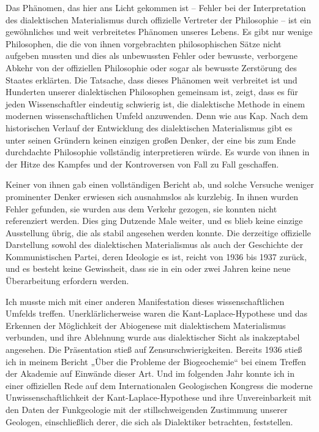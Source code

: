 \documentclass[11pt,a4paper]{book}
\begin{document}
Das Phänomen, das hier ans Licht gekommen ist -- Fehler bei der Interpretation des dialektischen Materialismus durch offizielle Vertreter der Philosophie -- ist ein gewöhnliches und weit verbreitetes Phänomen unseres Lebens. Es gibt nur wenige Philosophen, die die von ihnen vorgebrachten philosophischen Sätze nicht aufgeben mussten und dies als unbewussten Fehler oder bewusste, verborgene Abkehr von der offiziellen Philosophie oder sogar als bewusste Zerstörung des Staates erklärten. Die Tatsache, dass dieses Phänomen weit verbreitet ist und Hunderten unserer dialektischen Philosophen gemeinsam ist, zeigt, dass es für jeden Wissenschaftler eindeutig schwierig ist, die dialektische Methode in einem modernen wissenschaftlichen Umfeld anzuwenden. Denn wie aus Kap. Nach dem historischen Verlauf der Entwicklung des dialektischen Materialismus gibt es unter seinen Gründern keinen einzigen großen Denker, der eine bis zum Ende durchdachte Philosophie vollständig interpretieren würde. Es wurde von ihnen in der Hitze des Kampfes und der Kontroversen von Fall zu Fall geschaffen.



Keiner von ihnen gab einen vollständigen Bericht ab, und solche Versuche weniger prominenter Denker erwiesen sich ausnahmslos als kurzlebig. In ihnen wurden Fehler gefunden, sie wurden aus dem Verkehr gezogen, sie konnten nicht referenziert werden. Dies ging Dutzende Male weiter, und es blieb keine einzige Ausstellung übrig, die als stabil angesehen werden konnte. Die derzeitige offizielle Darstellung sowohl des dialektischen Materialismus als auch der Geschichte der Kommunistischen Partei, deren Ideologie es ist, reicht von 1936 bis 1937 zurück, und es besteht keine Gewissheit, dass sie in ein oder zwei Jahren keine neue Überarbeitung erfordern werden.



Ich musste mich mit einer anderen Manifestation dieses wissenschaftlichen Umfelds treffen. Unerklärlicherweise waren die Kant-Laplace-Hypothese und das Erkennen der Möglichkeit der Abiogenese mit dialektischem Materialismus verbunden, und ihre Ablehnung wurde aus dialektischer Sicht als inakzeptabel angesehen. Die Präsentation stieß auf Zensurschwierigkeiten. Bereits 1936 stieß ich in meinem Bericht „Über die Probleme der Biogeochemie“ bei einem Treffen der Akademie auf Einwände dieser Art. Und im folgenden Jahr konnte ich in einer offiziellen Rede auf dem Internationalen Geologischen Kongress die moderne Unwissenschaftlichkeit der Kant-Laplace-Hypothese und ihre Unvereinbarkeit mit den Daten der Funkgeologie mit der stillschweigenden Zustimmung unserer Geologen, einschließlich derer, die sich als Dialektiker betrachten, feststellen.
\end{document}
